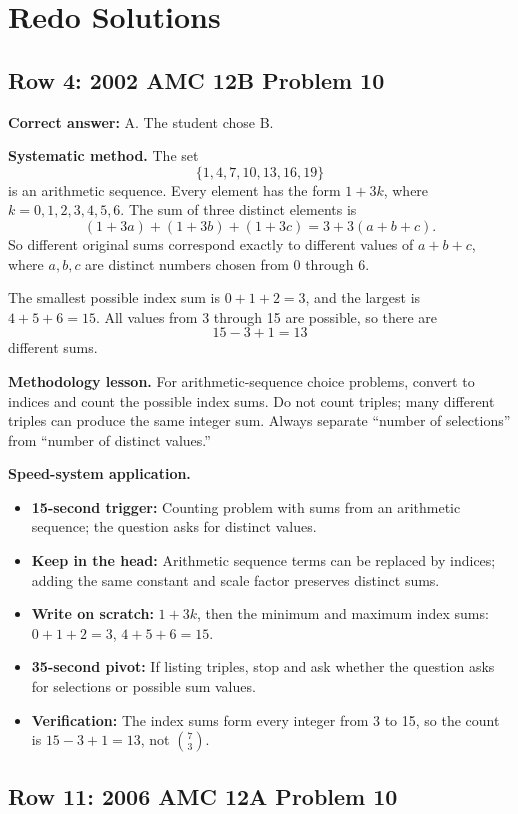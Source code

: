 \documentclass[11pt]{article}
\begin{document}
\section{Redo Solutions}

\subsection{Row 4: 2002 AMC 12B Problem 10}

\textbf{Correct answer:} A. The student chose B.

\textbf{Systematic method.} The set
\[
\{1,4,7,10,13,16,19\}
\]
is an arithmetic sequence. Every element has the form \(1+3k\), where \(k=0,1,2,3,4,5,6\). The sum of three distinct elements is
\[
(1+3a)+(1+3b)+(1+3c)=3+3(a+b+c).
\]
So different original sums correspond exactly to different values of \(a+b+c\), where \(a,b,c\) are distinct numbers chosen from \(0\) through \(6\).

The smallest possible index sum is \(0+1+2=3\), and the largest is \(4+5+6=15\). All values from 3 through 15 are possible, so there are
\[
15-3+1=13
\]
different sums.

\textbf{Methodology lesson.} For arithmetic-sequence choice problems, convert to indices and count the possible index sums. Do not count triples; many different triples can produce the same integer sum. Always separate ``number of selections'' from ``number of distinct values.''

\textbf{Speed-system application.}
\begin{itemize}
  \item \textbf{15-second trigger:} Counting problem with sums from an arithmetic sequence; the question asks for distinct values.
  \item \textbf{Keep in the head:} Arithmetic sequence terms can be replaced by indices; adding the same constant and scale factor preserves distinct sums.
  \item \textbf{Write on scratch:} \(1+3k\), then the minimum and maximum index sums: \(0+1+2=3\), \(4+5+6=15\).
  \item \textbf{35-second pivot:} If listing triples, stop and ask whether the question asks for selections or possible sum values.
  \item \textbf{Verification:} The index sums form every integer from 3 to 15, so the count is \(15-3+1=13\), not \(\binom{7}{3}\).
\end{itemize}

\subsection{Row 11: 2006 AMC 12A Problem 10}
\end{document}
